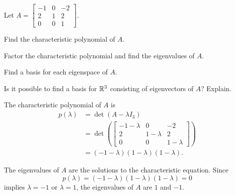  

\ExampleIntro

\begin{example} Let $A = \left[ \begin{array}{rcr} -1&0&-2 \\ 2&1&2 \\ 0&0&1 \end{array}\right]$. 
\ba
\item Find the characteristic polynomial of $A$. 

\item Factor the characteristic polynomial and find the eigenvalues of $A$. 

\item Find a basis for each eigenspace of $A$. 

\item Is it possible to find a basis for $\mathbb{R}^3$ consisting of eigenvectors of $A$? Explain. 

\ea


\ExampleSolution
\ba
\item The characteristic polynomial of $A$ is 
\begin{align*}
p(\lambda) &= \det(A - \lambda I_3) \\
	&= \det\left( \left[ \begin{array}{ccc} -1-\lambda&0&-2 \\ 2&1-\lambda&2 \\ 0&0&1-\lambda \end{array}\right] \right) \\
	&= (-1-\lambda)(1-\lambda)(1-\lambda).
\end{align*}

\item The eigenvalues of $A$ are the solutions to the characteristic equation. Since 
\[p(\lambda) = (-1-\lambda)(1-\lambda)(1-\lambda) = 0\]
implies $\lambda = -1$ or $\lambda = 1$, the eigenvalues of $A$ are $1$ and $-1$.


\end{example}
